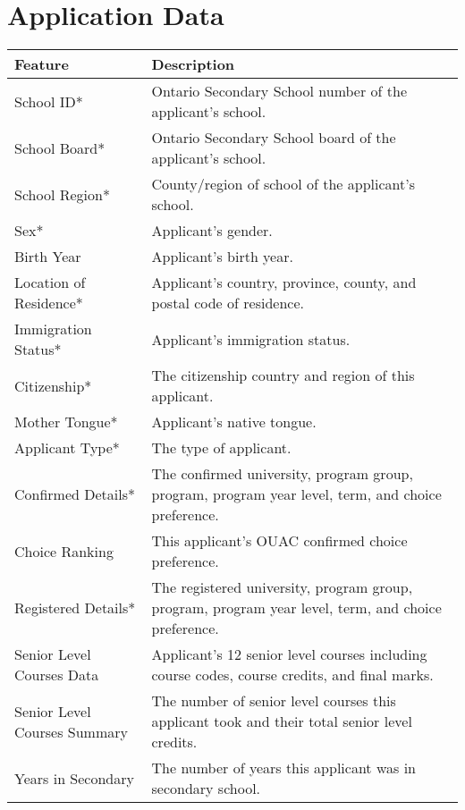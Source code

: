 \documentclass[12pt,twoside]{report}
\begin{document}
  
  
\appendix
{}
\chapter{Application Data}
\label{app:applicationData}
\begin{table}[!hb]
\footnotesize
\begin{center}
\begin{tabular}{| C{3.7cm} | C{10.3cm} |}\hline
	\textbf{Feature}				&\textbf{Description}\\\hline
	School ID*						&Ontario Secondary School number of the applicant's school.\\\hline
	School Board*					&Ontario Secondary School board of the applicant's school.\\\hline
	School Region*					&County/region of school of the applicant's school.\\\hline
	Sex*							&Applicant's gender.\\\hline
	Birth Year						&Applicant's birth year.\\\hline
	Location of Residence*			&Applicant's country, province, county, and postal code of residence.\\\hline
	Immigration Status*				&Applicant's immigration status.\\\hline
	Citizenship*					&The citizenship country and region of this applicant.\\\hline
	Mother Tongue*					&Applicant's native tongue.\\\hline
	Applicant Type*					&The type of applicant.\\\hline
	Confirmed Details*				&The confirmed university, program group, program, program year level, term, and choice preference.\\\hline
	Choice Ranking					&This applicant's OUAC confirmed choice preference.\\\hline
	Registered Details*				&The registered university, program group, program, program year level, term, and choice preference.\\\hline
	Senior Level Courses Data		&Applicant's 12 senior level courses including course codes, course credits, and final marks.\\\hline
	Senior Level Courses Summary	&The number of senior level courses this applicant took and their total senior level credits.\\\hline
	Years in Secondary				&The number of years this applicant was in secondary school.\\\hline

\end{tabular}
\end{center}
\end{table}
\end{document}
